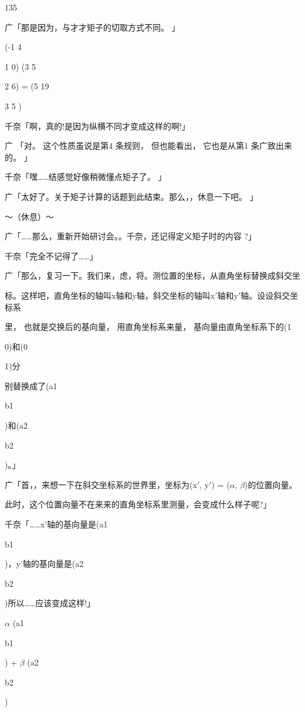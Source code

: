 135\par
广「那是因为，与才才矩子的切取方式不同。 」\par
(-1 4\par
1 0) (3 5\par
2 6) = (5 19\par
3 5 )\par
千奈「啊，真的!是因为纵横不同才变成这样的啊!」\par
广 「对。 这个性质虽说是第4 条规则， 但也能看出， 它也是从第1 条广致出来的。 」\par
千奈「嘿……结感觉好像稍微懂点矩子了。 」\par
广「太好了。关于矩子计算的话题到此结束。那么，，休息一下吧。 」\par
～（休息）～\par
广「……那么，重新开始研讨会。。千奈，还记得定义矩子时的内容 ?」\par
千奈「完全不记得了……」\par
广「那么，复习一下。我们来，虑，将。测位置的坐标，从直角坐标替换成斜交坐\par
标。这样吧，直角坐标的轴叫x轴和y轴，斜交坐标的轴叫x$\prime$轴和y$\prime$轴。设设斜交坐标系\par
里， 也就是交换后的基向量， 用直角坐标系来量， 基向量由直角坐标系下的(1\par
0)和(0\par
1)分\par
别替换成了(a1\par
b1\par
)和(a2\par
b2\par
)。」\par
广「首，，来想一下在斜交坐标系的世界里，坐标为(x$\prime$, y$\prime$) = ($\alpha$, $\beta$)的位置向量。\par
此时，这个位置向量不在来来的直角坐标系里测量，会变成什么样子呢?」\par
千奈「……x'轴的基向量是(a1\par
b1\par
)，y'轴的基向量是(a2\par
b2\par
)所以……应该变成这样!」\par
$\alpha$ (a1\par
b1\par
) + $\beta$ (a2\par
b2\par
)\par

